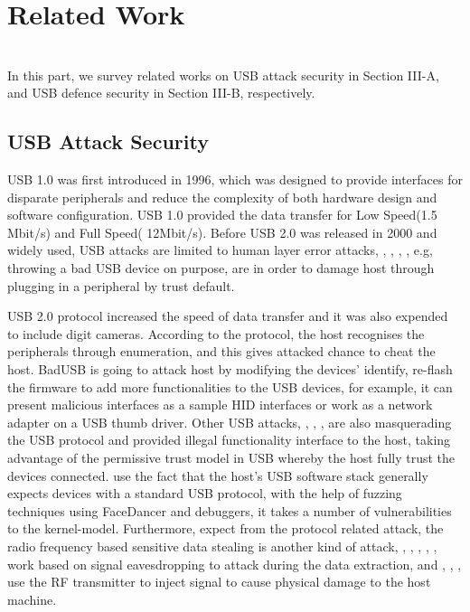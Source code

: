 \section{Related Work}
\label{sec:related_work}
\\
In this part, we survey related works on USB attack security in Section III-A, and USB defence security in Section III-B, respectively.
\subsection{USB Attack Security}
USB 1.0\cite{usb01} was first introduced in 1996, which was designed to provide interfaces for disparate peripherals and reduce the complexity of both hardware design and software configuration\cite{sok}. USB 1.0 provided the data transfer for Low Speed(1.5 Mbit/s) and Full Speed( 12Mbit/s). Before USB 2.0 was released in 2000 and widely used, USB attacks are limited to human layer error attacks, \cite{se}, \cite{goverment}, \cite{atkvec}, \cite{ueerreallydo}, e.g, throwing a bad USB device on purpose, are in order to damage host through plugging in a peripheral by trust default. 

USB 2.0 protocol increased the speed of data transfer and it was also expended to include digit cameras. According to the protocol, the host recognises the peripherals through enumeration, and this gives attacked chance to cheat the host. BadUSB\cite{badusb} is going to attack host by modifying the devices' identify, re-flash the firmware to add more functionalities to the USB devices, for example, it can present malicious interfaces as a sample HID interfaces or work as a network adapter on a USB thumb driver. Other USB attacks, \cite{rubber}, \cite{usbdriver}, \cite{usbbypassing}, \cite{iseeyou} are also masquerading the USB protocol and provided illegal functionality interface to the host, taking advantage of the permissive trust model in USB whereby the host fully trust the devices connected. \cite{syzkaller} use the fact that the host's USB software stack generally expects devices with a standard USB protocol, with the help of fuzzing techniques using FaceDancer \cite{facedancer} and debuggers, it takes a number of vulnerabilities to the kernel-model. Furthermore, expect from the protocol related attack, the radio frequency based sensitive data stealing is another kind of attack, \cite{smartphone} , \cite{poweremi}, \cite{badusbhub}, \cite{usbfinger}, \cite{side}, \cite{usbdriver} work based on signal eavesdropping to attack during the data extraction, and \cite{usbkiller}, \cite{cable}, \cite{usbee}, \cite{turnip} use the RF transmitter to inject signal to cause physical damage to the host machine.    

